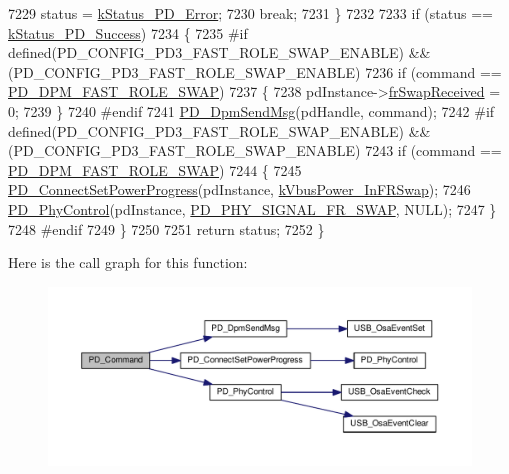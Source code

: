 \begin{DoxyCode}
7229             status = \hyperlink{group__usb__pd__stack_ggaaad4cd00dd02567c6169429e3a895073a4d58370b8ee8d3d2a4c477f7a3f84dda}{kStatus\_PD\_Error};
7230             \textcolor{keywordflow}{break};
7231     \}
7232 
7233     \textcolor{keywordflow}{if} (status == \hyperlink{group__usb__pd__stack_ggaaad4cd00dd02567c6169429e3a895073acf06f954f9c52f560cea34df48c63555}{kStatus\_PD\_Success})
7234     \{
7235 \textcolor{preprocessor}{#if defined(PD\_CONFIG\_PD3\_FAST\_ROLE\_SWAP\_ENABLE) && (PD\_CONFIG\_PD3\_FAST\_ROLE\_SWAP\_ENABLE)
}
7236 \textcolor{preprocessor}{}        \textcolor{keywordflow}{if} (command == \hyperlink{group__usb__pd__stack_ggabf2676c3360b7c572954ae09c0a5e46aa1af15d89c350437f5f4e8a95ea841f5b}{PD\_DPM\_FAST\_ROLE\_SWAP})
7237         \{
7238             pdInstance->\hyperlink{struct__pd__instance_ac9684a4a5a96ac21f503ad702a245a7e}{frSwapReceived} = 0;
7239         \}
7240 \textcolor{preprocessor}{#endif
}
7241 \textcolor{preprocessor}{}        \hyperlink{usb__pd__policy_8c_a4f173065c59e2f188edd90264410c503}{PD\_DpmSendMsg}(pdHandle, command);
7242 \textcolor{preprocessor}{#if defined(PD\_CONFIG\_PD3\_FAST\_ROLE\_SWAP\_ENABLE) && (PD\_CONFIG\_PD3\_FAST\_ROLE\_SWAP\_ENABLE)
}
7243 \textcolor{preprocessor}{}        \textcolor{keywordflow}{if} (command == \hyperlink{group__usb__pd__stack_ggabf2676c3360b7c572954ae09c0a5e46aa1af15d89c350437f5f4e8a95ea841f5b}{PD\_DPM\_FAST\_ROLE\_SWAP})
7244         \{
7245             \hyperlink{usb__pd__policy_8c_a83de99272e34bf7bad5146401157ccff}{PD\_ConnectSetPowerProgress}(pdInstance, 
      \hyperlink{group__usb__pd__stack_gga1af9af0106a9413093f8e0d9b796771badfb60998cac82d001b52af44674eef18}{kVbusPower\_InFRSwap});
7246             \hyperlink{usb__pd__policy_8c_a555b1880b5b259c3fdcd3da821e06cf2}{PD\_PhyControl}(pdInstance, \hyperlink{group__usb__pd__phy__drv_ggab8bfca50e2ac042b47a697c88f84c3eda8af796404dff0f47ecb6f0cab86613f2}{PD\_PHY\_SIGNAL\_FR\_SWAP}, NULL);
7247         \}
7248 \textcolor{preprocessor}{#endif
}
7249 \textcolor{preprocessor}{}    \}
7250 
7251     \textcolor{keywordflow}{return} status;
7252 \}
\end{DoxyCode}


Here is the call graph for this function\-:
\nopagebreak
\begin{figure}[H]
\begin{center}
\leavevmode
\includegraphics[width=350pt]{group__usb__pd__stack_gaa61d0ac40ef36db1ef5a88532f6eea90_cgraph}
\end{center}
\end{figure}




